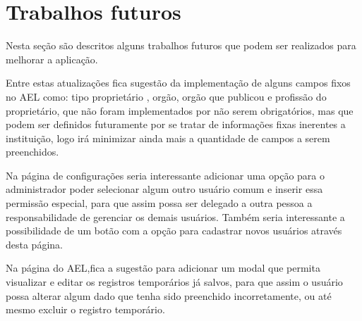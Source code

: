 \section{Trabalhos futuros}
Nesta seção são descritos alguns trabalhos futuros que podem ser realizados para melhorar a aplicação.

Entre estas atualizações fica sugestão da implementação de alguns campos fixos no AEL como: tipo proprietário , orgão, orgão que publicou e profissão do proprietário, que não foram implementados por não serem obrigatórios, mas que podem ser definidos futuramente por se tratar de informações fixas inerentes a instituição, logo irá minimizar ainda mais a quantidade de campos a serem preenchidos.

Na página de configurações seria interessante adicionar uma opção para o administrador poder selecionar algum outro usuário comum e inserir essa permissão especial, para que assim possa ser delegado a outra pessoa a responsabilidade de gerenciar os demais usuários. Também seria interessante a possibilidade de um botão com a opção para cadastrar novos usuários através desta página.

Na página do AEL,fica a sugestão para adicionar um modal que permita visualizar e editar os registros temporários já salvos, para que assim o usuário possa alterar algum dado que tenha sido preenchido incorretamente, ou até mesmo excluir o registro temporário.



